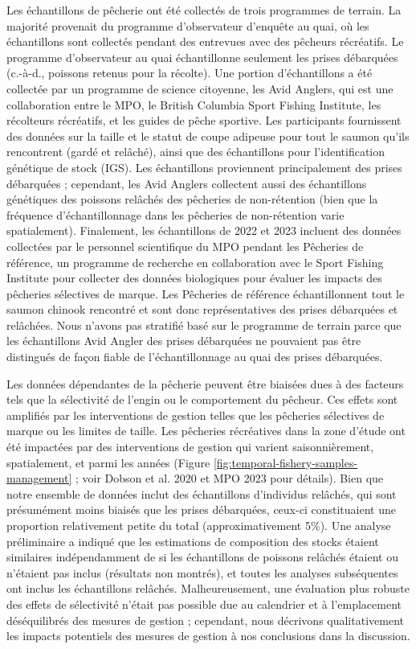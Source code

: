 Les échantillons de pêcherie ont été collectés de trois programmes de terrain. La majorité provenait du programme d'observateur d'enquête au quai, où les échantillons sont collectés pendant des entrevues avec des pêcheurs récréatifs. Le programme d'observateur au quai échantillonne seulement les prises débarquées (c.-à-d., poissons retenus pour la récolte). Une portion d'échantillons a été collectée par un programme de science citoyenne, les Avid Anglers, qui est une collaboration entre le MPO, le British Columbia Sport Fishing Institute, les récolteurs récréatifs, et les guides de pêche sportive. Les participants fournissent des données sur la taille et le statut de coupe adipeuse pour tout le saumon qu'ils rencontrent (gardé et relâché), ainsi que des échantillons pour l'identification génétique de stock (IGS). Les échantillons proviennent principalement des prises débarquées ; cependant, les Avid Anglers collectent aussi des échantillons génétiques des poissons relâchés des pêcheries de non-rétention (bien que la fréquence d'échantillonnage dans les pêcheries de non-rétention varie spatialement). Finalement, les échantillons de 2022 et 2023 incluent des données collectées par le personnel scientifique du MPO pendant les Pêcheries de référence, un programme de recherche en collaboration avec le Sport Fishing Institute pour collecter des données biologiques pour évaluer les impacts des pêcheries sélectives de marque. Les Pêcheries de référence échantillonnent tout le saumon chinook rencontré et sont donc représentatives des prises débarquées et relâchées. Nous n'avons pas stratifié basé sur le programme de terrain parce que les échantillons Avid Angler des prises débarquées ne pouvaient pas être distingués de façon fiable de l'échantillonnage au quai des prises débarquées.

Les données dépendantes de la pêcherie peuvent être biaisées dues à des facteurs tels que la sélectivité de l'engin ou le comportement du pêcheur. Ces effets sont amplifiés par les interventions de gestion telles que les pêcheries sélectives de marque ou les limites de taille. Les pêcheries récréatives dans la zone d'étude ont été impactées par des interventions de gestion qui varient saisonnièrement, spatialement, et parmi les années (Figure \ref{fig:temporal-fishery-samples-management} ; voir Dobson et al. 2020 et MPO 2023 pour détails). Bien que notre ensemble de données inclut des échantillons d'individus relâchés, qui sont présumément moins biaisés que les prises débarquées, ceux-ci constituaient une proportion relativement petite du total (approximativement 5\%). Une analyse préliminaire a indiqué que les estimations de composition des stocks étaient similaires indépendamment de si les échantillons de poissons relâchés étaient ou n'étaient pas inclus (résultats non montrés), et toutes les analyses subséquentes ont inclus les échantillons relâchés. Malheureusement, une évaluation plus robuste des effets de sélectivité n'était pas possible due au calendrier et à l'emplacement déséquilibrés des mesures de gestion ; cependant, nous décrivons qualitativement les impacts potentiels des mesures de gestion à nos conclusions dans la discussion.


